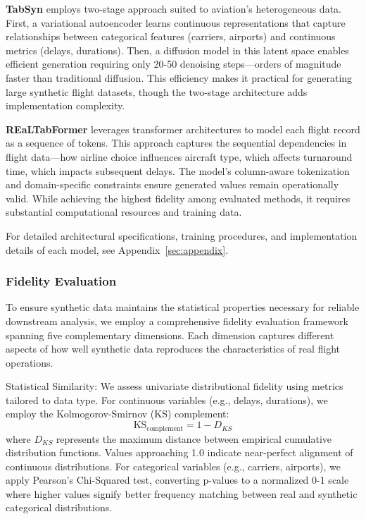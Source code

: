 \documentclass[conference]{IEEEtran}
\begin{document}
\textbf{TabSyn} \cite{zhang2024mixed} employs two-stage approach suited to aviation's heterogeneous data. First, a variational autoencoder learns continuous representations that capture relationships between categorical features (carriers, airports) and continuous metrics (delays, durations). Then, a diffusion model in this latent space enables efficient generation requiring only 20-50 denoising steps—orders of magnitude faster than traditional diffusion. This efficiency makes it practical for generating large synthetic flight datasets, though the two-stage architecture adds implementation complexity.

\textbf{REaLTabFormer} \cite{solatorio2023realtabformer} leverages transformer architectures to model each flight record as a sequence of tokens. This approach captures the sequential dependencies in flight data—how airline choice influences aircraft type, which affects turnaround time, which impacts subsequent delays. The model's column-aware tokenization and domain-specific constraints ensure generated values remain operationally valid. While achieving the highest fidelity among evaluated methods, it requires substantial computational resources and training data.

For detailed architectural specifications, training procedures, and implementation details of each model, see Appendix~\ref{sec:appendix}.


\subsubsection{Fidelity Evaluation}

To ensure synthetic data maintains the statistical properties necessary for reliable downstream analysis, we employ a comprehensive fidelity evaluation framework spanning five complementary dimensions. Each dimension captures different aspects of how well synthetic data reproduces the characteristics of real flight operations.

Statistical Similarity:
We assess univariate distributional fidelity using metrics tailored to data type. For continuous variables (e.g., delays, durations), we employ the Kolmogorov-Smirnov (KS) complement:
\begin{equation}
\text{KS}_{\text{complement}} = 1 - D_{KS}
\end{equation}
where $D_{KS}$ represents the maximum distance between empirical cumulative distribution functions. Values approaching 1.0 indicate near-perfect alignment of continuous distributions. For categorical variables (e.g., carriers, airports), we apply Pearson's Chi-Squared test, converting p-values to a normalized 0-1 scale where higher values signify better frequency matching between real and synthetic categorical distributions.
\end{document}
